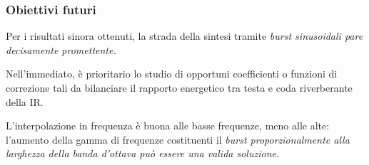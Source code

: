 \documentclass[10pt]{beamer}
\begin{document}
\begin{frame}
  \frametitle{Obiettivi futuri}
  
  Per i risultati sinora ottenuti, la strada della sintesi tramite \em burst \em 
  sinusoidali pare decisamente promettente.\\
  \vskip 0.3cm
  \begin{block}{}
  Nell'immediato, \`e prioritario lo studio di opportuni coefficienti o funzioni 
  di correzione tali da bilanciare il rapporto energetico tra testa e coda
  riverberante della IR.\\
  \end{block}
  \vskip 0.3cm
  L'interpolazione in frequenza \`e buona alle basse frequenze, meno alle alte:
  l'aumento della gamma di frequenze costituenti il \em burst \em proporzionalmente
  alla larghezza della banda d'ottava pu\`o essere una valida soluzione.
  
\end{frame}
\end{document}
